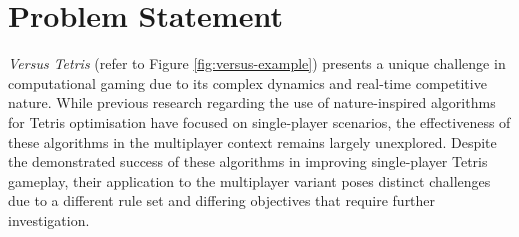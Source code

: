 \documentclass[a4paper, 12pt]{extreport}
\begin{document}
		\section{Problem Statement}
			
			
			
			\textit{Versus Tetris} (refer to Figure \ref{fig:versus-example}) presents a unique challenge in computational gaming due to its complex dynamics and real-time competitive nature. While previous research regarding the use of nature-inspired algorithms for Tetris optimisation have focused on single-player scenarios, the effectiveness of these algorithms in the multiplayer context remains largely unexplored. Despite the demonstrated success of these algorithms in improving single-player Tetris gameplay, their application to the multiplayer variant poses distinct challenges due to a different rule set and differing objectives that require further investigation.
			
\end{document}
